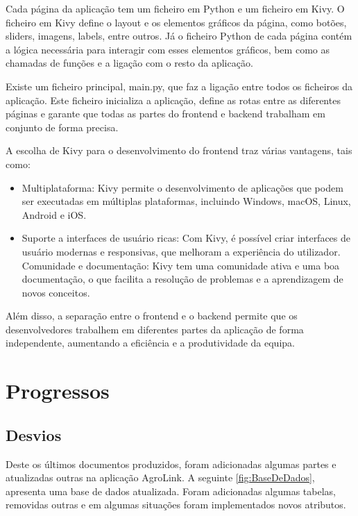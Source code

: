 \documentclass[a4paper,12pt]{report}
\begin{document}
	Cada página da aplicação tem um ficheiro em Python e um ficheiro em Kivy. O ficheiro em Kivy define o layout e os elementos gráficos da página, como botões, sliders, imagens, labels, entre outros. Já o ficheiro Python de cada página contém a lógica necessária para interagir com esses elementos gráficos, bem como as chamadas de funções e a ligação com o resto da aplicação.
	
	Existe um ficheiro principal, main.py, que faz a ligação entre todos os ficheiros da aplicação. Este ficheiro inicializa a aplicação, define as rotas entre as diferentes páginas e garante que todas as partes do frontend e backend trabalham em conjunto de forma precisa.
	
	A escolha de Kivy para o desenvolvimento do frontend traz várias vantagens, tais como:
	
		\begin{itemize}
			\item Multiplataforma: Kivy permite o desenvolvimento de aplicações que podem ser executadas em múltiplas plataformas, incluindo Windows, macOS, Linux, Android e iOS.
			
			\item Suporte a interfaces de usuário ricas: Com Kivy, é possível criar interfaces de usuário modernas e responsivas, que melhoram a experiência do utilizador.
			Comunidade e documentação: Kivy tem uma comunidade ativa e uma boa documentação, o que facilita a resolução de problemas e a aprendizagem de novos conceitos.
		\end{itemize}
	
	Além disso, a separação entre o frontend e o backend permite que os desenvolvedores trabalhem em diferentes partes da aplicação de forma independente, aumentando a eficiência e a produtividade da equipa.
	
	\chapter{Progressos}
	\section{Desvios}
	Deste os últimos documentos produzidos, foram adicionadas algumas partes e atualizadas
	outras na aplicação AgroLink. A seguinte \ref{fig:BaseDeDados}, apresenta uma base de dados atualizada. Foram adicionadas algumas tabelas, removidas outras e em algumas situações foram implementados novos atributos.
	
\end{document}

